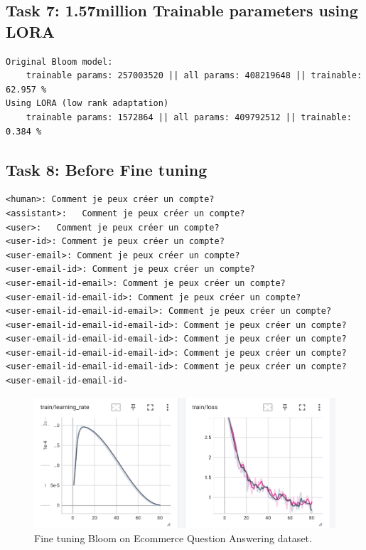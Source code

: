 \documentclass[a4paper]{article}
\begin{document}
\subsection*{Task 7: 1.57million Trainable parameters using LORA}
\begin{verbatim}
Original Bloom model:
    trainable params: 257003520 || all params: 408219648 || trainable: 62.957 %
Using LORA (low rank adaptation)
    trainable params: 1572864 || all params: 409792512 || trainable: 0.384 %
\end{verbatim}



\subsection*{Task 8: Before Fine tuning}
\begin{verbatim}
<human>: Comment je peux créer un compte?  
<assistant>:   Comment je peux créer un compte?  
<user>:   Comment je peux créer un compte?  
<user-id>: Comment je peux créer un compte?  
<user-email>: Comment je peux créer un compte?  
<user-email-id>: Comment je peux créer un compte?  
<user-email-id-email>: Comment je peux créer un compte?  
<user-email-id-email-id>: Comment je peux créer un compte?  
<user-email-id-email-id-email>: Comment je peux créer un compte?  
<user-email-id-email-id-email-id>: Comment je peux créer un compte?  
<user-email-id-email-id-email-id>: Comment je peux créer un compte?  
<user-email-id-email-id-email-id>: Comment je peux créer un compte?  
<user-email-id-email-id-email-id>: Comment je peux créer un compte?  
<user-email-id-email-id-
\end{verbatim}


\begin{figure}[ht]
    \centering
    \includegraphics[width=.6\textwidth]{figures/training_finetuning_bloom.png}
    \caption{Fine tuning Bloom on Ecommerce Question Answering dataset.}
    \label{fig:finetuning_bloom}
\end{figure}
\end{document}
